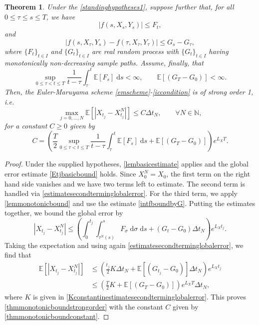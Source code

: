 \documentclass[reqno,12pt]{amsart}
\theoremstyle{plain}%
\newtheorem{thm}{Theorem}[section]
\theoremstyle{definition}
\begin{document}
\begin{thm}
  \label{thmmonotonicbound}
  Under the \cref{standinghypotheses1}, suppose further that, for all $0 \leq \tau \leq s \leq T$, we have
    \begin{equation}
      |f(s, X_s, Y_s)| \leq F_t,
    \end{equation}
    and
    \begin{equation}
      \label{thmhypmonotonicbound}
        |f(s, X_\tau, Y_s) - f(\tau, X_\tau, Y_\tau)| \leq G_s - G_\tau,
    \end{equation}
    where $\{F_t\}_{t\in I}$ and $\{G_t\}_{t\in I}$ are real random process with $\{G_t\}_{t\in I}$ having monotonically non-decreasing sample paths. Assume, finally, that
    \[
        \sup_{0 \leq \tau < t \leq T}\frac{1}{t - \tau}\int_\tau^t \mathbb{E}[F_s]\;\mathrm{d}s < \infty, \qquad \mathbb{E}[(G_T - G_0)] < \infty.
    \]
    Then, the Euler-Maruyama scheme \eqref{emscheme}-\eqref{iccondition} is of strong order 1, i.e.
    \begin{equation}
      \label{thmmonotonicboundstrongorder}
        \max_{j=0, \ldots, N}\mathbb{E}\left[ \left| X_{t_j} - X_{t_j}^N \right| \right] \leq C \Delta t_N, \qquad \forall N \in \mathbb{N},
    \end{equation}
    for a constant $C \geq 0$ given by
    \begin{equation}
      \label{thmmonotonicboundconstant}
      C = \left(\frac{T}{2}\sup_{0 \leq \tau < t \leq T}\frac{1}{t - \tau}\int_\tau^t \mathbb{E}[F_s]\;\mathrm{d}s + \mathbb{E}[(G_{T} - G_0)] \right)e^{L_X T}.
    \end{equation}
\end{thm}

\begin{proof}
  Under the supplied hypotheses, \cref{lembasicestimate} applies and the global error estimate \eqref{Etjbasicbound} holds. Since $X_0^N = X_0$, the first term on the right hand side vanishes and we have two terms left to estimate. The second term is handled via \cref{estimatesecondterminglobalerror}. For the third term, we apply \cref{lemmonotonicbound} and use the estimate \eqref{intfboundbyG}. Putting the estimates together, we bound the global error by
  \[
    |X_{t_j} - X_{t_j}^N| \leq \left( \int_0^{t_j} \int_{\tau^N(s)}^s F_\sigma \;\mathrm{d}\sigma \;\mathrm{d}s + (G_t - G_0)\Delta t_N\right) e^{L_X t_j}.
  \]
  Taking the expectation and using again \cref{estimatesecondterminglobalerror}, we find that
  \begin{align*}
    \mathbb{E}\left[ |X_{t_j} - X_{t_j}^N|\right] & \leq \left( \frac{t_j}{2}K \Delta t_N + \mathbb{E}[(G_{t_j} - G_0)]\Delta t_N\right) e^{L_X t_j} \\
    & \leq \left( \frac{T}{2}K + \mathbb{E}[(G_{T} - G_0)]\right) e^{L_X T}\Delta t_N,
  \end{align*}
  where $K$ is given in \eqref{Kconstantinestimatesecondterminglobalerror}. This proves \eqref{thmmonotonicboundstrongorder} with the constant $C$ given by \eqref{thmmonotonicboundconstant}.
\end{proof}
\end{document}
